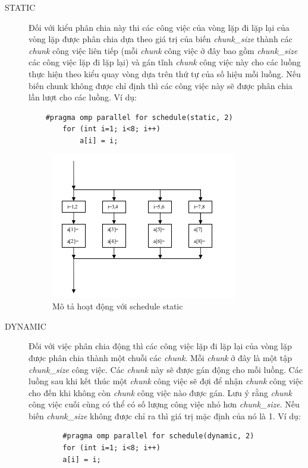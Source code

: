 \documentclass{report}
\begin{document}
\begin{description}
	\item[STATIC] Đối với kiểu phân chia này thi các công việc của vòng lặp đi lặp lại của vòng lặp được phân chia dựa theo giá trị của biến \emph{chunk\_size} thành các \emph{chunk} công việc liên tiếp (mỗi \emph{chunk} công việc ở đây bao gồm \emph{chunk\_size} các công việc lặp đi lặp lại) và gán tĩnh \emph{chunk} công việc này cho các luồng thực hiện theo kiểu quay vòng dựa trên thứ tự của số hiệu mỗi luồng. Nếu biến chunk không được chỉ định thì các công việc này sẽ được phân chia lần lượt cho các luồng.
	Ví dụ:
	\begin{verbatim}
	#pragma omp parallel for schedule(static, 2)
		for (int i=1; i<8; i++)
			a[i] = i;
	\end{verbatim}
	\begin{figure}[htp]
		\centering
		\includegraphics[scale=1.0]{img/pic5.png}
		\caption{Mô tả hoạt động với schedule static}
		\end{figure}
	\item[DYNAMIC]
	Đối với việc phân chia động thì các công việc lặp đi lặp lại của vòng lặp được
	phân chia thành một chuỗi các \emph{chunk}. Mỗi \emph{chunk} ở đây là một tập \emph{chunk\_size} công việc. Các \emph{chunk} này sẽ được gán động cho mỗi luồng. Các luồng sau khi kết thúc một \emph{chunk} công việc sẽ đợi để nhận \emph{chunk} công việc cho đến khi không còn \emph{chunk} công việc nào được gán. Lưu ý rằng \emph{chunk} công việc cuối cùng có thể có số lượng công việc nhỏ hơn \emph{chunk\_size}. Nếu biến \emph{chunk\_size} không được chỉ ra thì giá trị mặc định của nó là 1.
	Ví dụ:
		\begin{verbatim}
		#pragma omp parallel for schedule(dynamic, 2)
		for (int i=1; i<8; i++)
		a[i] = i;
		\end{verbatim}
			\begin{figure}[htp]

\end{figure}
\end{description}
\end{document}
